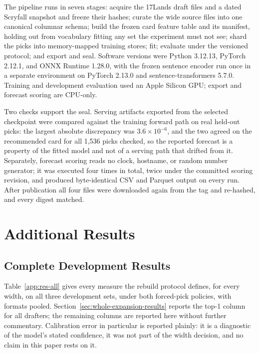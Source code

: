 \documentclass[11pt]{article}
\numberwithin{equation}{section}
\begin{document}
The pipeline runs in seven stages: acquire the 17Lands draft files and a dated
Scryfall snapshot and freeze their hashes; curate the wide source files into one
canonical columnar schema; build the frozen card feature table and its manifest,
holding out from vocabulary fitting any set the experiment must not see; shard
the picks into memory-mapped training stores; fit; evaluate under the versioned
protocol; and export and seal. Software versions were Python 3.12.13, PyTorch
2.12.1, and ONNX Runtime 1.28.0, with the frozen sentence encoder run once in a
separate environment on PyTorch 2.13.0 and sentence-transformers 5.7.0. Training
and development evaluation used an Apple Silicon GPU; export and forecast scoring
are CPU-only.

Two checks support the seal. Serving artifacts exported from the selected
checkpoint were compared against the training forward path on real held-out
picks: the largest absolute discrepancy was $3.6\times10^{-6}$, and the two
agreed on the recommended card for all 1,536 picks checked, so the reported
forecast is a property of the fitted model and not of a serving path that
drifted from it. Separately, forecast scoring reads no clock, hostname, or random
number generator; it was executed four times in total, twice under the committed
scoring revision, and produced byte-identical CSV and Parquet output on every
run. After publication all four files were downloaded again from the tag and
re-hashed, and every digest matched.

\section{Additional Results}
\label{app:additional-results}

\subsection{Complete Development Results}
\label{app:full-dev-tables}

Table~\ref{app:res-all} gives every measure the rebuild protocol defines, for
every width, on all three development sets, under both forced-pick policies, with
formats pooled. Section~\ref{sec:whole-expansion-results} reports the top-1
column for all drafters; the remaining columns are reported here without further
commentary. Calibration error in particular is reported plainly: it is a
diagnostic of the model's stated confidence, it was not part of the width
decision, and no claim in this paper rests on it.
\end{document}
